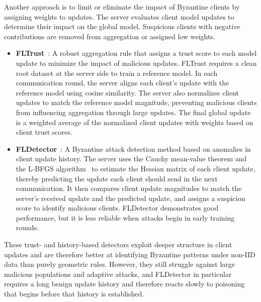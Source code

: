 \documentclass[journal]{IEEEtran}
\begin{document}
Another approach is to limit or eliminate the impact of Byzantine clients by assigning weights to updates. The server evaluates client model updates to determine their impact on the global model. Suspicious clients with negative contributions are removed from aggregation or assigned low weights.

\begin{itemize}
    \item \textbf{FLTrust}~\cite{cao2020fltrust}: A robust aggregation rule that assigns a trust score to each model update to minimize the impact of malicious updates. FLTrust requires a clean root dataset at the server side to train a reference model. In each communication round, the server aligns each client's update with the reference model using cosine similarity. The server also normalizes client updates to match the reference model magnitude, preventing malicious clients from influencing aggregation through large updates. The final global update is a weighted average of the normalized client updates with weights based on client trust scores.

    \item \textbf{FLDetector}~\cite{zhang2022fldetector}: A Byzantine attack detection method based on anomalies in client update history. The server uses the Cauchy mean-value theorem and the L-BFGS algorithm~\cite{liu1989limited} to estimate the Hessian matrix of each client update, thereby predicting the update each client should send in the next communication. It then compares client update magnitudes to match the server's received update and the predicted update, and assigns a suspicion score to identify malicious clients. FLDetector demonstrates good performance, but it is less reliable when attacks begin in early training rounds.
\end{itemize}

These trust- and history-based detectors exploit deeper structure in client updates and are therefore better at identifying Byzantine patterns under non-IID data than purely geometric rules. However, they still struggle against large malicious populations and adaptive attacks, and FLDetector in particular requires a long benign update history and therefore reacts slowly to poisoning that begins before that history is established.
\end{document}
